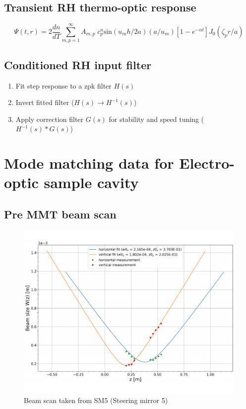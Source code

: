 \subsection{Transient RH thermo-optic response}

\begin{equation}
	\Psi(t,r)=2\frac{dn}{dT} \sum^{\infty}_{m,p = 1} A_{m,p} \; c^{u}_{p} \mathrm{sin}(u_m h /2a) (a/u_m)[1-e^{-\alpha t}] J_0(\zeta_p r/a)
\end{equation}

\subsection{Conditioned RH input filter}
\begin{enumerate}	
	\item Fit step response to a zpk filter $H(s)$ 
	\item Invert fitted filter ($H(s) \rightarrow H^{-1}(s)$) 
	\item Apply correction filter $G(s)$ for stability and speed tuning ($H^{-1}(s)*G(s)$)
\end{enumerate}

\section{Mode matching data for Electro-optic sample cavity}

\subsection{Pre MMT beam scan}

\begin{figure}[H]
\includegraphics[width=\textwidth]{figs/ALGAAS/beam_scans/12_18_2020_preMMT.pdf}
\caption{Beam scan taken from SM5 (Steering mirror 5)}
\label{fig:beamscan2020}
\end{figure}


